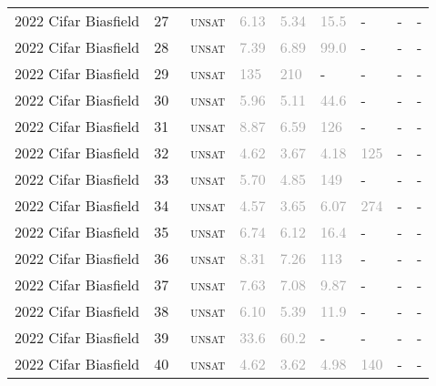 \begin{center}
{\begin{longtable}{@{}lllllllll@{}}
2022 Cifar Biasfield & 27 & ~\textsc{unsat} & \textcolor{darkgray}{6.13} & \textcolor{darkgray}{5.34} & \textcolor{darkgray}{15.5} & - & - & - \\
2022 Cifar Biasfield & 28 & ~\textsc{unsat} & \textcolor{darkgray}{7.39} & \textcolor{darkgray}{6.89} & \textcolor{darkgray}{99.0} & - & - & - \\
2022 Cifar Biasfield & 29 & ~\textsc{unsat} & \textcolor{darkgray}{135} & \textcolor{darkgray}{210} & - & - & - & - \\
2022 Cifar Biasfield & 30 & ~\textsc{unsat} & \textcolor{darkgray}{5.96} & \textcolor{darkgray}{5.11} & \textcolor{darkgray}{44.6} & - & - & - \\
2022 Cifar Biasfield & 31 & ~\textsc{unsat} & \textcolor{darkgray}{8.87} & \textcolor{darkgray}{6.59} & \textcolor{darkgray}{126} & - & - & - \\
2022 Cifar Biasfield & 32 & ~\textsc{unsat} & \textcolor{darkgray}{4.62} & \textcolor{darkgray}{3.67} & \textcolor{darkgray}{4.18} & \textcolor{darkgray}{125} & - & - \\
2022 Cifar Biasfield & 33 & ~\textsc{unsat} & \textcolor{darkgray}{5.70} & \textcolor{darkgray}{4.85} & \textcolor{darkgray}{149} & - & - & - \\
2022 Cifar Biasfield & 34 & ~\textsc{unsat} & \textcolor{darkgray}{4.57} & \textcolor{darkgray}{3.65} & \textcolor{darkgray}{6.07} & \textcolor{darkgray}{274} & - & - \\
2022 Cifar Biasfield & 35 & ~\textsc{unsat} & \textcolor{darkgray}{6.74} & \textcolor{darkgray}{6.12} & \textcolor{darkgray}{16.4} & - & - & - \\
2022 Cifar Biasfield & 36 & ~\textsc{unsat} & \textcolor{darkgray}{8.31} & \textcolor{darkgray}{7.26} & \textcolor{darkgray}{113} & - & - & - \\
2022 Cifar Biasfield & 37 & ~\textsc{unsat} & \textcolor{darkgray}{7.63} & \textcolor{darkgray}{7.08} & \textcolor{darkgray}{9.87} & - & - & - \\
2022 Cifar Biasfield & 38 & ~\textsc{unsat} & \textcolor{darkgray}{6.10} & \textcolor{darkgray}{5.39} & \textcolor{darkgray}{11.9} & - & - & - \\
2022 Cifar Biasfield & 39 & ~\textsc{unsat} & \textcolor{darkgray}{33.6} & \textcolor{darkgray}{60.2} & - & - & - & - \\
2022 Cifar Biasfield & 40 & ~\textsc{unsat} & \textcolor{darkgray}{4.62} & \textcolor{darkgray}{3.62} & \textcolor{darkgray}{4.98} & \textcolor{darkgray}{140} & - & - \\

\end{longtable}}
\end{center}

